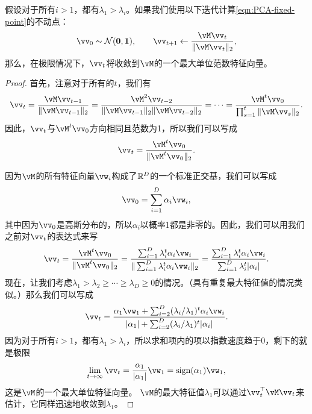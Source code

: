 \documentclass[../../book-main_zh.tex]{subfiles}
\begin{document}
\begin{theorem}[幂迭代]
假设对于所有\(i > 1\)，都有\(\lambda_{1} > \lambda_{i}\)。如果我们使用以下迭代计算\eqref{eqn:PCA-fixed-point}的不动点：
\begin{equation}\label{eq:power_iteration}
    \vv_{0} \sim \dNorm(\vzero, \vone), \qquad \vv_{t + 1} \gets \frac{\vM\vv_{t}}{\norm{\vM\vv_{t}}_{2}},
\end{equation}
那么，在极限情况下，\(\vv_{t}\)将收敛到\(\vM\)的一个最大单位范数特征向量。
\end{theorem}

\begin{proof} 首先，注意对于所有的\(t\)，我们有
\begin{equation}
    \vv_{t} = \frac{\vM\vv_{t - 1}}{\norm{\vM\vv_{t - 1}}_{2}} = \frac{\vM^{2}\vv_{t - 2}}{\norm{\vM\vv_{t - 1}}_{2}\norm{\vM\vv_{t - 2}}_{2}} = \cdots = \frac{\vM^{t}\vv_{0}}{\prod_{s = 1}^{t}\norm{\vM\vv_{s}}_{2}}.
\end{equation}
因此，\(\vv_{t}\)与\(\vM^{t}\vv_{0}\)方向相同且范数为1，所以我们可以写成
\begin{equation}
    \vv_{t} = \frac{\vM^{t}\vv_{0}}{\norm{\vM^{t}\vv_{0}}_{2}}.
\end{equation}

因为$\vM$的所有特征向量\(\vw_{i}\)构成了\(\mathbb{R}^{D}\)的一个标准正交基，我们可以写成
\begin{equation}
    \vv_{0} = \sum_{i = 1}^{D}\alpha_{i}\vw_{i},
\end{equation}
其中因为\(\vv_{0}\)是高斯分布的，所以\(\alpha_{i}\)以概率1都是非零的。因此，我们可以用我们之前对\(\vv_{t}\)的表达式来写
\begin{equation}
    \vv_{t} = \frac{\vM^{t}\vv_{0}}{\norm{\vM^{t}\vv_{0}}_{2}} = \frac{\sum_{i = 1}^{D}\lambda_{i}^{t}\alpha_{i}\vw_{i}}{\norm{\sum_{i = 1}^{D}\lambda_{i}^{t}\alpha_{i}\vw_{i}}_{2}} = \frac{\sum_{i = 1}^{D}\lambda_{i}^{t}\alpha_{i}\vw_{i}}{\sum_{i = 1}^{D}\lambda_{i}^{t}\abs{\alpha_{i}}}. 
\end{equation}
现在，让我们考虑\(\lambda_{1} > \lambda_{2} \geq \cdots \geq \lambda_{D} \geq 0\)的情况。（具有重复最大特征值的情况类似。）那么我们可以写成
\begin{equation}
    \vv_{t} = \frac{\alpha_{1}\vw_{1} + \sum_{i = 2}^{D}(\lambda_{i}/\lambda_{1})^{t}\alpha_{i}\vw_{i}}{\abs{\alpha_{1}} + \sum_{i = 2}^{D}(\lambda_{i}/\lambda_{1})^{t}\abs{\alpha_{i}}}.
\end{equation}
因为对于所有\(i > 1\)，都有\(\lambda_{1} > \lambda_{i}\)，所以求和项内的项以指数速度趋于\(0\)，剩下的就是极限
\begin{equation}
    \lim_{t \to \infty}\vv_{t} = \frac{\alpha_{1}}{\abs{\alpha_{1}}}\vw_{1} = \sign(\alpha_{1})\vw_{1},
\end{equation}
这是\(\vM\)的一个最大单位特征向量。 \(\vM\)的最大特征值\(\lambda_{1}\)可以通过\(\vv_{t}^{\top}\vM\vv_{t}\)来估计，它同样迅速地收敛到\(\lambda_{1}\)。
\end{proof}
\end{document}
